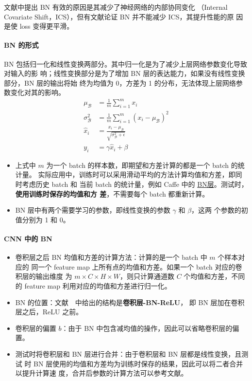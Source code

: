 文献中提出 BN 有效的原因是其减少了神经网络的内部协同变化
（Internal Covariate Shift，ICS），但有文献论证 BN 并不能减少 ICS，其提升性能的原
因是使 loss 变得更平滑。

\paragraph{BN 的形式}
BN 包括归一化和线性变换两部分。其中归一化是为了减少上层网络参数变化导致对输入的影
响；线性变换部分是为了增加 BN 层的表达能力，如果没有线性变换部分，BN 层的输出将始
终为均值为 0，方差为 1 的分布，无法体现上层网络参数变化对其的影响。
\begin{align}
  \label{equ:BN}
  \mu_{\mathcal{B}} & = \frac{1}{m} \sum_{i=1}^{m} x_i \\
  \sigma_{\mathcal{B}}^2 & = \frac{1}{m} \sum_{i=1}^{m} (x_i-\mu_{\mathcal{B}})^2 \\
  \hat{x}_i & = \frac{x_i - \mu_{\mathcal{B}}}{\sqrt{\sigma_{\mathcal{B}}^2 + \epsilon}} \\
  y_i & = \gamma \hat{x}_i + \beta
\end{align}

\begin{itemize}
\item 上式中 $m$ 为一个 batch 的样本数，即期望和方差计算的都是一个 batch 的统计量。
  实际应用中，训练时可以采用滑动平均的方法计算均值和方差，即同时考虑历史 batch 和
  当前 batch 的统计量，例如 Caffe 中的
  \href{https://bit.ly/2JBY7aw}{BN层}。测试时，\textbf{使用训练时保存的均值和方
    差}，不需要每个 batch 都重新计算。
  \item BN 层中有两个需要学习的参数，即线性变换的参数 $\gamma$ 和 $\beta$，这两
    个参数的初值分别为 1 和 0。
\end{itemize}

\paragraph{CNN 中的 BN}
\begin{itemize}
  \item 卷积层之后 BN 均值和方差的计算方法：计算的是一个 batch 中 $m$ 个样本对应的
    同一个 feature map 上所有点的均值和方差。如果一个 batch 对应的卷积层的输出维度
    为 $m \times C \times H \times W$，则只计算通道数 $C$ 个均值和方差，不同
    的 feature map 利用对应的均值和方差进行归一化。
  \item BN 的位置：文献~~中给出的结构是\textbf{卷积层-BN-ReLU}，
    即 BN 层加在卷积层之后，ReLU 之前。
  \item 卷积层的偏置 $b$：由于 BN 中包含减均值的操作，因此可以省略卷积层的偏置。
  \item 测试时将卷积层和 BN 层进行合并：由于卷积层和 BN 层都是线性变换，且测试
    时 BN 层使用的均值和方差均为训练时保存的结果，因此可以将二者合并以提升计算速
    度，合并后参数的计算方法可以参考文献。
\end{itemize}

